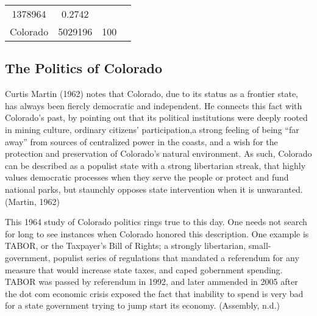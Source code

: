 \documentclass[12pt,twoside]{reedthesis}
\begin{document}
\begin{longtable}[]{@{}cccc@{}}
\begin{minipage}[t]{0.21\columnwidth}
  1378964\strut
  \end{minipage} & \begin{minipage}[t]{0.20\columnwidth}\centering\strut
  0.2742\strut
  \end{minipage} & \begin{minipage}[t]{0.34\columnwidth}\centering\strut
  \strut
  \end{minipage}\tabularnewline
  \begin{minipage}[t]{0.13\columnwidth}\centering\strut
  Colorado\strut
  \end{minipage} & \begin{minipage}[t]{0.21\columnwidth}\centering\strut
  5029196\strut
  \end{minipage} & \begin{minipage}[t]{0.20\columnwidth}\centering\strut
  100\strut
  \end{minipage} & \begin{minipage}[t]{0.34\columnwidth}\centering\strut
  \strut
  \end{minipage}\tabularnewline
  \bottomrule
  \end{longtable}
  
  \subsection{The Politics of Colorado}\label{the-politics-of-colorado}
  
  Curtis Martin (1962) notes that Colorado, due to its status as a
  frontier state, has always been fiercly democratic and independent. He
  connects this fact with Colorado's past, by pointing out that its
  political institutions were deeply rooted in mining culture, ordinary
  citizens' participation,a strong feeling of being ``far away'' from
  sources of centralized power in the coasts, and a wish for the
  protection and preservation of Colorado's natural environment. As such,
  Colorado can be described as a populist state with a strong libertarian
  streak, that highly values democratic processes when they serve the
  people or protect and fund national parks, but staunchly opposes state
  intervention when it is unwaranted. (Martin, 1962)
  
  \clearpage
  
  This 1964 study of Colorado politics rings true to this day. One needs
  not search for long to see instances when Colorado honored this
  description. One example is TABOR, or the Taxpayer's Bill of Rights; a
  strongly libertarian, small-government, populist series of regulations
  that mandated a referendum for any measure that would increase state
  taxes, and caped gobernment spending. TABOR was passed by referendum in
  1992, and later ammended in 2005 after the dot com economic crisis
  exposed the fact that inability to spend is very bad for a state
  government trying to jump start its economy. (Assembly, n.d.)
  
\end{document}
